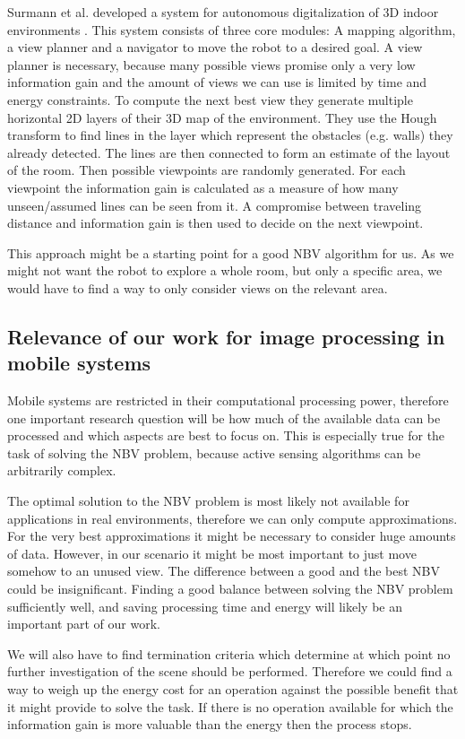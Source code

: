 \documentclass[a4paper,11pt,english]{article}
\begin{document}
Surmann et al. developed a system for autonomous digitalization of 3D indoor environments \cite{surmann2003autonomous}.
This system consists of three core modules: A mapping algorithm, a view planner and a navigator to move the robot to a desired goal.
A view planner is necessary, because many possible views promise only a very low information gain and the amount of views we can use is limited by time and energy constraints.
To compute the next best view they generate multiple horizontal 2D layers of their 3D map of the environment.
They use the Hough transform to find lines in the layer which represent the obstacles (e.g. walls) they already detected.
The lines are then connected to form an estimate of the layout of the room.
Then possible viewpoints are randomly generated.
For each viewpoint the information gain is calculated as a measure of how many unseen/assumed lines can be seen from it.
A compromise between traveling distance and information gain is then used to decide on the next viewpoint.

This approach might be a starting point for a good NBV algorithm for us. As we might not want the robot to explore a whole room, but only a specific area, we would have to find a way to only consider views on the relevant area.

\subsection{Relevance of our work for image processing in mobile systems}\label{relevanceimageprocessing}
Mobile systems are restricted in their computational processing power, therefore one important research question will be how much of the available data can be processed and which aspects are best to focus on. 
This is especially true for the task of solving the NBV problem, because active sensing algorithms can be arbitrarily complex.

The optimal solution to the NBV problem is most likely not available for applications in real environments, therefore we can only compute approximations.
For the very best approximations it might be necessary to consider huge amounts of data.
However, in our scenario it might be most important to just move somehow to an unused view. The difference between a good and the best NBV could be insignificant.
Finding a good balance between solving the NBV problem sufficiently well, and saving processing time and energy will likely be an important part of our work.

We will also have to find termination criteria which determine at which point no further investigation of the scene should be performed.
Therefore we could find a way to weigh up the energy cost for an operation against the possible benefit that it might provide to solve the task.
If there is no operation available for which the information gain is more valuable than the energy then the process stops.
\end{document}

